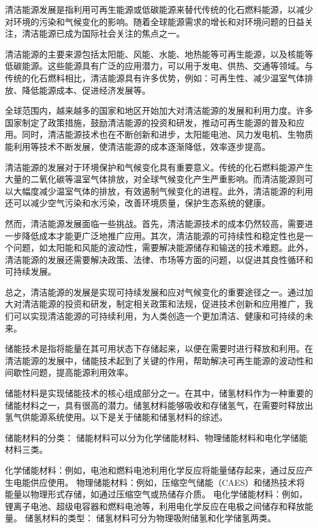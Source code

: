 清洁能源发展是指利用可再生能源或低碳能源来替代传统的化石燃料能源，以减少对环境的污染和气候变化的影响。随着全球能源需求的增长和对环境问题的日益关注，清洁能源已成为国际社会关注的焦点之一。

清洁能源的主要来源包括太阳能、风能、水能、地热能等可再生能源，以及核能等低碳能源。这些能源具有广泛的应用潜力，可以用于发电、供热、交通等领域。与传统的化石燃料相比，清洁能源具有许多优势，例如：可再生性、减少温室气体排放、降低能源成本、促进经济发展等。

全球范围内，越来越多的国家和地区开始加大对清洁能源的发展和利用力度。许多国家制定了政策措施，鼓励清洁能源的投资和研发，推动可再生能源的普及和应用。同时，清洁能源技术也在不断创新和进步，太阳能电池、风力发电机、生物质能利用等技术不断发展，使清洁能源的成本逐渐降低，效率逐步提高。

清洁能源的发展对于环境保护和气候变化具有重要意义。传统的化石燃料能源产生大量的二氧化碳等温室气体排放，对全球气候变化产生严重影响。而清洁能源则可以大幅度减少温室气体的排放，有效遏制气候变化的进程。此外，清洁能源的利用还可以减少空气污染和水污染，改善环境质量，保护生态系统的健康。

然而，清洁能源发展面临一些挑战。首先，清洁能源技术的成本仍然较高，需要进一步降低成本才能更广泛地推广应用。其次，清洁能源的可持续性和稳定性也是一个问题，如太阳能和风能的波动性，需要解决能源储存和输送的技术难题。此外，清洁能源的发展还需要解决政策、法律、市场等方面的问题，以促进其良性循环和可持续发展。

总之，清洁能源的发展是实现可持续发展和应对气候变化的重要途径之一。通过加大对清洁能源的投资和研发，制定相关政策和法规，促进技术创新和应用推广，我们可以实现清洁能源的可持续利用，为人类创造一个更加清洁、健康和可持续的未来。

储能技术是指将能量在其可用状态下存储起来，以便在需要时进行释放和利用。在清洁能源的发展中，储能技术起到了关键的作用，帮助解决可再生能源的波动性和间歇性问题，提高能源利用效率。

储能材料是实现储能技术的核心组成部分之一。在其中，储氢材料作为一种重要的储能材料之一，具有很高的潜力。储氢材料能够吸收和存储氢气，在需要时释放出氢气供能源系统使用。以下是关于储能和储氢材料的综述。

储能材料的分类：
储能材料可以分为化学储能材料、物理储能材料和电化学储能材料三类。

化学储能材料：例如，电池和燃料电池利用化学反应将能量储存起来，通过反应产生电能供应使用。
物理储能材料：例如，压缩空气储能（CAES）和储热技术将能量以物理形式存储，如通过压缩空气或热储存介质。
电化学储能材料：例如，锂离子电池、超级电容器和燃料电池等，利用电化学反应在电极之间储存和释放能量。
储氢材料的类型：
储氢材料可分为物理吸附储氢和化学储氢两类。

